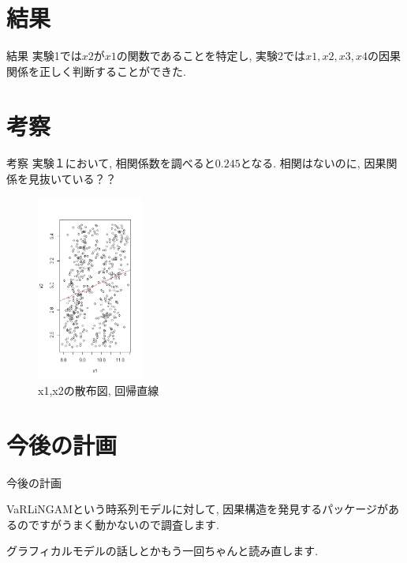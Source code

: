 \documentclass[dvipdfmx]{beamer}
\begin{document}
\section{結果}
\begin{frame}{結果}
実験1では$x2$が$x1$の関数であることを特定し, 実験2では$x1,x2,x3,x4$の因果関係を正しく判断することができた.
\end{frame}

\section{考察}
\begin{frame}{考察}
実験１において, 相関係数を調べると$0.245$となる.
相関はないのに, 因果関係を見抜いている？？

\begin{figure}[H]
\begin{center}
\includegraphics[clip,width=35mm]{data/sam1.png}
\caption{x1,x2の散布図, 回帰直線}
\end{center}
\end{figure}

\end{frame}

\section{今後の計画}
\begin{frame}{今後の計画}

VaRLiNGAMという時系列モデルに対して, 因果構造を発見するパッケージがあるのですがうまく動かないので調査します.

グラフィカルモデルの話しとかもう一回ちゃんと読み直します.

\end{frame}
\end{document}

